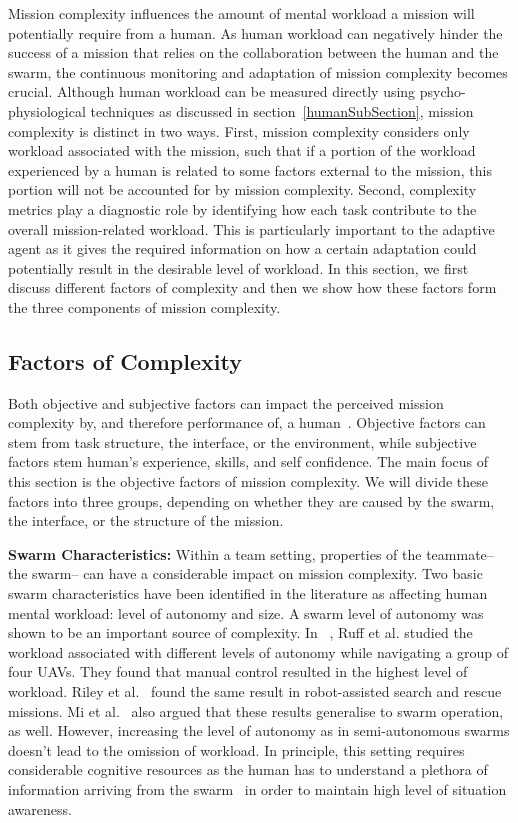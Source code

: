\documentclass[journal]{IEEEtran}
\begin{document}
Mission complexity influences the amount of mental workload a mission will potentially require from a human. 
As human workload can negatively hinder the success of a mission that relies on the collaboration between the human and the swarm, the continuous monitoring and adaptation of mission complexity becomes crucial. Although human workload can be measured directly using psycho-physiological techniques as discussed in section~\ref{humanSubSection}, mission complexity is distinct in two ways. First, mission complexity considers only workload associated with the mission, such that if a portion of the workload experienced by a human is related to some factors external to the mission, this portion will not be accounted for by mission complexity. Second, complexity metrics play a diagnostic role by identifying how each task contribute to the overall mission-related workload. This is particularly important to the adaptive agent as it gives the required information on how  a certain adaptation could potentially result in the desirable level of workload.
In this section, we first discuss different factors of complexity and then we show how these factors form the three components of mission complexity.

\subsection{Factors of Complexity}
Both objective and subjective factors can impact the perceived mission complexity by, and therefore performance of, a human~\cite{objectiveSubjective}. Objective factors can stem from task structure, the interface, or the environment, while subjective factors stem human\textquoteright s experience, skills, and self confidence.
The main focus of this section is the objective factors of mission complexity. We will divide these factors into three groups, depending on whether they are caused by the swarm, the interface, or the structure of the mission.

\textbf{Swarm Characteristics: }
Within a team setting, properties of the teammate-- the swarm-- can have a considerable impact on mission complexity. Two basic swarm characteristics have been identified in the literature as affecting human mental workload: level of autonomy and size. 
A swarm level of autonomy was shown to be an important source of complexity. In ~\cite{ruff2002},  Ruff et al. studied the workload associated with different levels of autonomy while navigating a group of four UAVs. They found that manual control resulted in the highest level of workload. Riley et al.~\cite{usarJ} found the same result in robot-assisted search and rescue missions.   Mi et al.~\cite{LOA} also argued that these results generalise to swarm operation, as well. 
However, increasing the level of autonomy as in semi-autonomous swarms doesn\textquoteright t lead to the omission of workload. In principle, this setting requires considerable cognitive resources as the human has to understand a plethora of information arriving from the swarm~\cite{swarmingNetwork} in order to maintain high level of situation awareness.  
\end{document}

